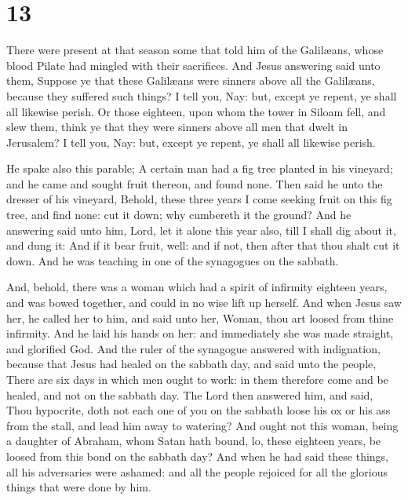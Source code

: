 \hypertarget{section-12}{%
\section{13}\label{section-12}}

 There were present at that season some that told him of
the Galilæans, whose blood Pilate had mingled with their sacrifices.
 And Jesus answering said unto them, Suppose ye that these
Galilæans were sinners above all the Galilæans, because they suffered
such things?  I tell you, Nay: but, except ye repent, ye
shall all likewise perish.  Or those eighteen, upon whom
the tower in Siloam fell, and slew them, think ye that they were sinners
above all men that dwelt in Jerusalem?  I tell you, Nay:
but, except ye repent, ye shall all likewise perish.

 He spake also this parable; A certain man had a fig tree
planted in his vineyard; and he came and sought fruit thereon, and found
none.  Then said he unto the dresser of his vineyard,
Behold, these three years I come seeking fruit on this fig tree, and
find none: cut it down; why cumbereth it the ground?  And
he answering said unto him, Lord, let it alone this year also, till I
shall dig about it, and dung it:  And if it bear fruit,
well: and if not, then after that thou shalt cut it down.
 And he was teaching in one of the synagogues on the
sabbath.

 And, behold, there was a woman which had a spirit of
infirmity eighteen years, and was bowed together, and could in no wise
lift up herself.  And when Jesus saw her, he called her
to him, and said unto her, Woman, thou art loosed from thine infirmity.
 And he laid his hands on her: and immediately she was
made straight, and glorified God.  And the ruler of the
synagogue answered with indignation, because that Jesus had healed on
the sabbath day, and said unto the people, There are six days in which
men ought to work: in them therefore come and be healed, and not on the
sabbath day.  The Lord then answered him, and said, Thou
hypocrite, doth not each one of you on the sabbath loose his ox or his
ass from the stall, and lead him away to watering?  And
ought not this woman, being a daughter of Abraham, whom Satan hath
bound, lo, these eighteen years, be loosed from this bond on the sabbath
day?  And when he had said these things, all his
adversaries were ashamed: and all the people rejoiced for all the
glorious things that were done by him.

